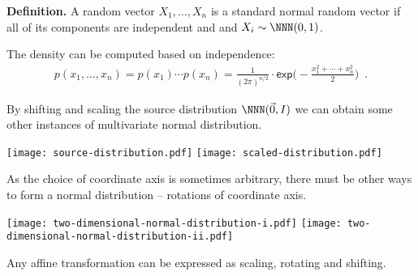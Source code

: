 \documentclass[landscape,footrule]{foils}
\begin{document}



\vspace*{-1.0cm}

\textbf{Definition.} A random vector $X_1,\ldots, X_n$ is a standard normal random vector if all of its components are independent and and $X_i\sim \NNN(0,1)$.
\begin{triangles}
\item The density can be computed based on independence:
\begin{align*}
p(x_1,\ldots,x_n)=p(x_1)\cdots p(x_n)=\frac{1}{(2\pi)^{n/2}}\cdot\mathsf{exp}\Biggl(-\frac{x_1^2+\cdots+x_n^2}{2}\Biggl)\enspace.
\end{align*}
\end{triangles}


By shifting and scaling the source distribution $\NNN(\vec{0},I)$ we can obtain some other instances of multivariate normal distribution.
\vspace*{-1cm}

\begin{center}
\texttt{[image: source-distribution.pdf]}
\texttt{[image: scaled-distribution.pdf]}
\end{center}\vspace*{-10cm}






As the choice of coordinate axis is sometimes arbitrary, there must be other ways to form a normal distribution -- rotations of coordinate axis.\vspace*{-1cm}  

\begin{center}
\texttt{[image: two-dimensional-normal-distribution-i.pdf]}
\texttt{[image: two-dimensional-normal-distribution-ii.pdf]}
\end{center}\vspace*{-1cm}

Any affine transformation can be expressed as scaling, rotating and shifting.




\end{document}
